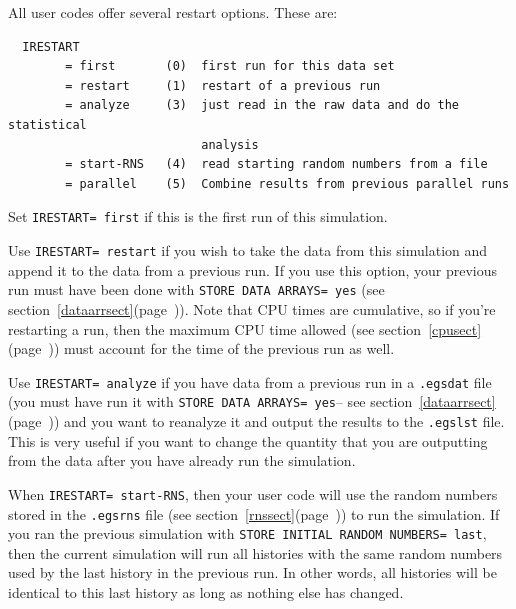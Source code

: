 \documentclass[12pt,twoside]{article}  %
\newcommand{\lpage}[1]{(page~\pageref{#1})}
\begin{document}
All user codes offer several restart options.  These are:

\begin{verbatim}
  IRESTART
        = first       (0)  first run for this data set
        = restart     (1)  restart of a previous run
        = analyze     (3)  just read in the raw data and do the statistical
                           analysis
        = start-RNS   (4)  read starting random numbers from a file
        = parallel    (5)  Combine results from previous parallel runs 
\end{verbatim}

Set {\tt IRESTART= first} if this is the first run of this simulation.

Use {\tt IRESTART= restart} if you wish to take the data from this simulation
and append it to the data from a previous run.  If you use this option, your
previous run must have been done with {\tt STORE DATA ARRAYS= yes}
(see section~\ref{dataarrsect}\lpage{dataarrsect}).  Note that CPU times
are cumulative, so if you're restarting a run, then the maximum CPU time
allowed (see section~\ref{cpusect}\lpage{cpusect}) must account for the time of
the previous run as well.

Use {\tt IRESTART= analyze} if you have data from a previous run in
a {\tt .egsdat} file (you must have run it with {\tt STORE DATA ARRAYS= yes}--
see section~\ref{dataarrsect}\lpage{dataarrsect}) and you want to reanalyze it and output
the results to the {\tt .egslst} file.  This is very useful if 
you want to change the quantity that you are outputting from the data after
you have already run the simulation.

When {\tt IRESTART= start-RNS}, then your user code will use the
random numbers stored in the {\tt .egsrns} file (see
section~\ref{rnssect}\lpage{rnssect}) to run the simulation.  If you ran the previous simulation
with {\tt STORE INITIAL RANDOM NUMBERS= last}, then the current simulation
will run all histories with the same random numbers used by the last
history in the previous run.  In other words, all histories will be identical
to this last history as long as nothing else has changed.

\end{document}
